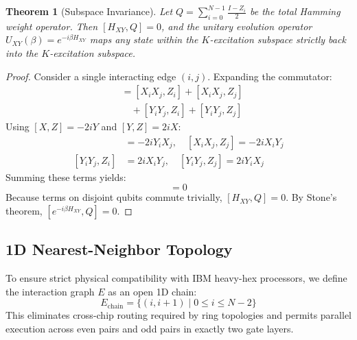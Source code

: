 \documentclass[10pt,twocolumn]{article}
\newtheorem{theorem}{Theorem}
\begin{document}
\begin{theorem}[Subspace Invariance]
Let $Q = \sum_{i=0}^{N-1} \frac{I - Z_i}{2}$ be the total Hamming weight operator. Then $[H_{XY}, Q] = 0$, and the unitary evolution operator $U_{XY}(\beta) = e^{-i \beta H_{XY}}$ maps any state within the $K$-excitation subspace strictly back into the $K$-excitation subspace.
\end{theorem}
\begin{proof}
Consider a single interacting edge $(i, j)$. Expanding the commutator:
\begin{align*}
[X_i X_j + Y_i Y_j, Z_i + Z_j] &= [X_i X_j, Z_i] + [X_i X_j, Z_j] \\
&\quad + [Y_i Y_j, Z_i] + [Y_i Y_j, Z_j]
\end{align*}
Using $[X, Z] = -2iY$ and $[Y, Z] = 2iX$:
\begin{align*}
[X_i X_j, Z_i] &= -2i Y_i X_j, \quad [X_i X_j, Z_j] = -2i X_i Y_j \\
[Y_i Y_j, Z_i] &= 2i X_i Y_j, \quad [Y_i Y_j, Z_j] = 2i Y_i X_j
\end{align*}
Summing these terms yields:
\begin{equation}
[X_i X_j + Y_i Y_j, Z_i + Z_j] = 0
\end{equation}
Because terms on disjoint qubits commute trivially, $[H_{XY}, Q] = 0$. By Stone's theorem, $[e^{-i \beta H_{XY}}, Q] = 0$.
\end{proof}

\subsection{1D Nearest-Neighbor Topology}
To ensure strict physical compatibility with IBM heavy-hex processors, we define the interaction graph $E$ as an open 1D chain:
\begin{equation}
E_{\text{chain}} = \{(i, i+1) \mid 0 \le i \le N-2\}
\end{equation}
This eliminates cross-chip routing required by ring topologies and permits parallel execution across even pairs and odd pairs in exactly two gate layers.
\end{document}
